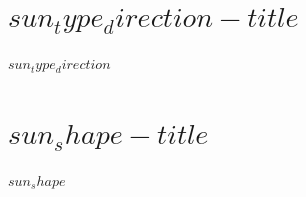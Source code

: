 \documentclass{article}
\begin{document}
\section{$sun_type_direction-title$}
$sun_type_direction$

\section{$sun_shape-title$}
$sun_shape$
\end{document}
